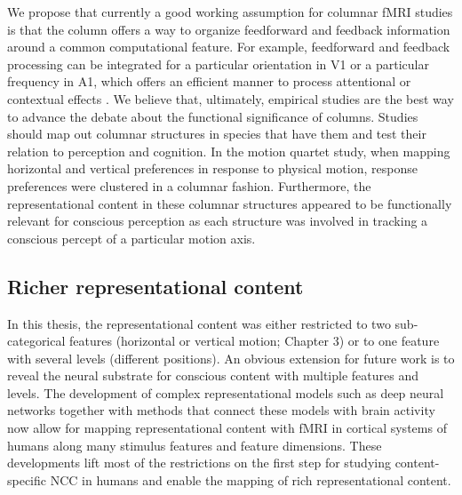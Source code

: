 We propose that currently a good working assumption for columnar fMRI studies is that the column offers a way to organize feedforward and feedback information around a common computational feature. For example, feedforward and feedback processing can be integrated for a particular orientation in V1 or a particular frequency in A1, which offers an efficient manner to process attentional or contextual effects \parencite{DeMartino2015}. We believe that, ultimately, empirical studies are the best way to advance the debate about the functional significance of columns. Studies should map out columnar structures in species that have them and test their relation to perception and cognition. In the motion quartet study, when mapping horizontal and vertical preferences in response to physical motion, response preferences were clustered in a columnar fashion. Furthermore, the representational content in these columnar structures appeared to be functionally relevant for conscious perception as each structure was involved in tracking a conscious percept of a particular motion axis.

\subsection{Richer representational content}
In this thesis, the representational content was either restricted to two sub-categorical features (horizontal or vertical motion; Chapter 3) or to one feature with several levels (different positions). An obvious extension for future work is to reveal the neural substrate for conscious content with multiple features and levels. The development of complex representational models such as deep neural networks \parencite{Kriegeskorte2014, Kriegeskorte2015, Yamins2016, Bashivan2019} together with methods that connect these models with brain activity \parencite{Kriegeskorte2008, Naselaris2011, Diedrichsen2017, Diedrichsen2018} now allow for mapping representational content with fMRI in cortical systems of humans along many stimulus features and feature dimensions. These developments lift most of the restrictions on the first step for studying content-specific NCC in humans and enable the mapping of rich representational content.  

